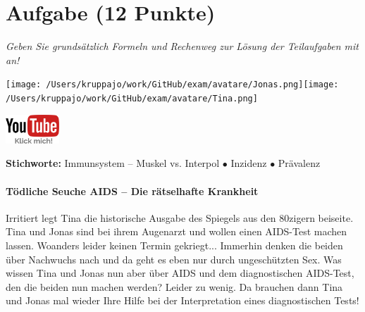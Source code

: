 \documentclass[a4paper, 9pt]{scrartcl}\usepackage[]{graphicx}\usepackage[]{xcolor}
\begin{document}
 
\clearpage

\section{Aufgabe \hfill (12 Punkte)}

\textit{Geben Sie grundsätzlich Formeln und Rechenweg zur Lösung der Teilaufgaben mit an!} \\[1Ex]
 

 
\begin{minipage}[t]{0.5\textwidth}
\texttt{[image: /Users/kruppajo/work/GitHub/exam/avatare/Jonas.png]}\hspace{-4mm}\texttt{[image: /Users/kruppajo/work/GitHub/exam/avatare/Tina.png]}
\end{minipage}
\begin{minipage}[t]{0.5\textwidth}
\hfill
\href{https://youtu.be/flRBo1FWQy0}{\includegraphics[width = 2cm]{img/youtube}}
\end{minipage}

{\tiny\textbf{Stichworte:} Immunsystem -- Muskel vs. Interpol $\bullet$ Inzidenz $\bullet$ Prävalenz}




\paragraph{Tödliche Seuche AIDS -- Die rätselhafte Krankheit}




Irritiert legt Tina die historische Ausgabe des Spiegels aus den 80zigern beiseite. Tina und Jonas sind bei ihrem Augenarzt und wollen einen AIDS-Test machen lassen. Woanders leider keinen Termin gekriegt... Immerhin denken die beiden über Nachwuchs nach und da geht es eben nur durch ungeschützten Sex. Was wissen Tina und Jonas nun aber über AIDS und dem diagnostischen AIDS-Test, den die beiden nun machen werden? Leider zu wenig. Da brauchen dann Tina und Jonas mal wieder Ihre Hilfe bei der Interpretation eines diagnostischen Tests!\\
\end{document}
